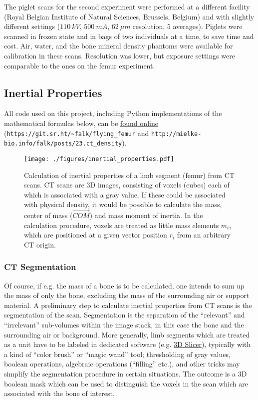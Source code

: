 The piglet scans for the second experiment were performed at a different facility (Royal Belgian Institute of Natural Sciences, Brussels, Belgium) and with slightly different settings (\(110\ kV\), \(500\ mA\), \(62\ \mu m\) resolution, \(5\) averages).
Piglets were scanned in frozen state and in bags of two individuals at a time, to save time and cost.
Air, water, and the bone mineral density phantoms were available for calibration in these scans.
Resolution was lower, but exposure settings were comparable to the ones on the femur experiment.


\subsection{Inertial Properties}
\label{sec:orgca33e4a}

All code used on this project, including Python implementations of the mathematical formulas below, can be \href{https://git.sr.ht/\~falk/flying\_femur}{found online} (\nolinkurl{https://git.sr.ht/~falk/flying_femur} and \nolinkurl{http://mielke-bio.info/falk/posts/23.ct_density}).

\begin{figure}[p]
\centering
\texttt{[image: ./figures/inertial\_properties.pdf]}
\caption{\label{fig:inertials}Calculation of inertial properties of a limb segment (femur) from CT scans. CT scans are 3D images, consisting of voxels (cubes) each of which is associated with a gray value. If these could be associated with physical density, it would be possible to calculate the mass, center of mass (\(\vec{COM}\)) and mass moment of inertia. In the calculation procedure, voxels are treated as little mass elements \(m_{i}\), which are positioned at a given vector position \(r_{i}\) from an arbitrary CT origin.}
\end{figure}

\subsubsection{CT Segmentation}
\label{sec:org15e8f1c}
Of course, if e.g. the mass of a bone is to be calculated, one intends to sum up the mass of only the bone, excluding the mass of the surrounding air or support material.
A preliminary step to calculate inertial properties from CT scans is the segmentation of the scan.
Segmentation is the separation of the ``relevant'' and ``irrelevant'' sub-volumes within the image stack, in this case the bone and the surrounding air or background.
More generally, limb segments which are treated as a unit have to be labeled in dedicated software (e.g. \href{https://www.slicer.org}{3D Slicer}), typically with a kind of ``color brush'' or ``magic wand'' tool; thresholding of gray values, boolean operations, algebraic operations (``filling'' etc.), and other tricks may simplify the segmentation procedure in certain situations.
The outcome is a 3D boolean mask which can be used to distinguish the voxels in the scan which are associated with the bone of interest.

